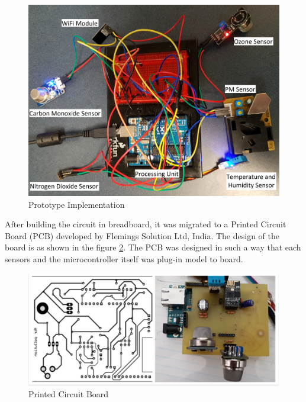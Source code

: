  \begin{figure}[h]
  \begin{center}
  \includegraphics[scale=0.09]{./images/figure14.jpg}
  \end{center}
  \caption{Prototype Implementation}
  \label{prototype}
\end{figure}

After building the circuit in breadboard, it was migrated to a Printed Circuit Board (PCB) developed by Flemings Solution Ltd, India. The design of the board is as shown in the figure \ref{pcb}. The PCB was designed in such a way that each sensors and the microcontroller itself was plug-in model to board. 

\begin{figure}[h]
  \begin{center}
  \includegraphics[scale=0.70]{./images/figure18.png}
  \end{center}
  \caption{Printed Circuit Board}
  \label{pcb}
\end{figure}

